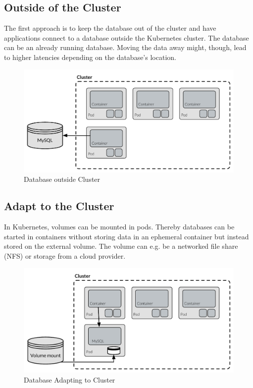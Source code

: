 \subsection*{Outside of the Cluster}
The first approach is to keep the database out of the cluster and have applications connect to a database outside the Kubernetes cluster. The database can be an already running database. Moving the data away might, though, lead to higher latencies depending on the database's location.

\begin{figure}
    \centering
    \includegraphics[width=12cm]{figures/appendix/database_outside_cluster}
    \caption{Database outside Cluster}
    \label{fig:db_outside_cluster}
\end{figure}


\subsection*{Adapt to the Cluster}
In Kubernetes, volumes can be mounted in pods. Thereby databases can be started in containers without storing data in an ephemeral container but instead stored on the external volume. The volume can e.g. be a networked file share (NFS) or storage from a cloud provider.

\begin{figure}
    \centering
    \includegraphics[width=12cm]{figures/appendix/database_adapt_cluster}
    \caption{Database Adapting to Cluster}
    \label{fig:db_adapt_cluster}
\end{figure}

